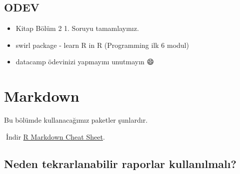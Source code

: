 \documentclass[
  oneside]{book}
\newenvironment{Shaded}{\begin{snugshade}}{\end{snugshade}}
\newcommand{\AttributeTok}[1]{\textcolor[rgb]{0.13,0.29,0.53}{#1}}
\newcommand{\CommentTok}[1]{\textcolor[rgb]{0.56,0.35,0.01}{\textit{#1}}}
\newcommand{\ConstantTok}[1]{\textcolor[rgb]{0.56,0.35,0.01}{#1}}
\newcommand{\FunctionTok}[1]{\textcolor[rgb]{0.13,0.29,0.53}{\textbf{#1}}}
\newcommand{\NormalTok}[1]{#1}
\newcommand{\SpecialCharTok}[1]{\textcolor[rgb]{0.81,0.36,0.00}{\textbf{#1}}}
\begin{document}
\hypertarget{odev}{%
\section{\texorpdfstring{\textbf{ODEV}}{ODEV}}\label{odev}}

\begin{itemize}
\item
  Kitap Bölüm 2 1. Soruyu tamamlayınız.
\item
  swirl package - learn R in R (Programming ilk 6 modul)
\item
  datacamp ödevinizi yapmayını unutmayın 😄
\end{itemize}

\hypertarget{markdown}{%
\chapter{Markdown}\label{markdown}}

Bu bölümde kullanacağımız paketler şunlardır.

\begin{Shaded}
\end{Shaded}

🔗İndir \href{https://www.rstudio.org/links/r_markdown_cheat_sheet}{R Markdown Cheat Sheet}.

\hypertarget{neden-tekrarlanabilir-raporlar-kullanux131lmalux131}{%
\section{Neden tekrarlanabilir raporlar kullanılmalı?}\label{neden-tekrarlanabilir-raporlar-kullanux131lmalux131}}
\end{document}
